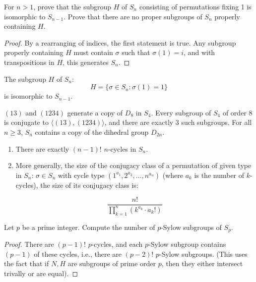 \documentclass[openany]{book}
\begin{document}
\begin{prob}[4.8]
    For $n > 1$, prove that the subgroup $H$ of $S_n$ consisting of permutations fixing 1 is isomorphic to $S_{n-1}$. Prove that there are no proper subgroups of $S_n$ properly containing $H$.
    \end{prob}
\begin{proof}
    By a rearranging of indices, the first statement is true. Any subgroup properly containing $H$ must contain $\sigma$ such that $\sigma(1)=i$, and with transpositions in $H$, this generates $S_n$. 
\end{proof}
\begin{prop}
    The subgroup $H$ of $S_n$:
    \begin{equation*}
        H=\{\sigma\in S_n: \sigma(1)=1\}
    \end{equation*}
    is isomorphic to $S_{n-1}$.
\end{prop}
    
    \begin{prop}[4.9]
    $(13)$ and $(1234)$ generate a copy of $D_8$ in $S_4$. Every subgroup of $S_4$ of order 8 is conjugate to $\langle (13), (1234)\rangle$, and there are exactly $3$ such subgroups. For all $n \geq 3$, $S_n$ contains a copy of the dihedral group $D_{2n}$.
    \end{prop}
    

    \begin{prop}[4.10]
        \begin{enumerate}
            \item There are exactly $(n-1)!$ $n$-cycles in $S_n$.
            \item More generally, the size of the conjugacy class of a permutation of given type in $S_n$: \(\sigma \in S_n\) with cycle type \((1^{a_1}, 2^{a_2}, \ldots, n^{a_n})\) (where \(a_k\) is the number of \(k\)-cycles), the size of its conjugacy class is:

            \[
            \frac{n!}{\prod_{k=1}^n (k^{a_k} \cdot a_k!)}
            \]
        \end{enumerate}
    \end{prop}
    
    \begin{prob}[4.11]
    Let $p$ be a prime integer. Compute the number of $p$-Sylow subgroups of $S_p$.
    \end{prob}
    \begin{proof}
        There are $(p-1)!$ $p$-cycles, and each $p$-Sylow subgroup contains $(p-1)$ of these cycles, i.e., there are $(p-2)!$ $p$-Sylow subgroups. (This uses the fact that if $N,H$ are subgroups of prime order $p$, then they either intersect trivally or are equal).
    \end{proof}
    
\end{document}
